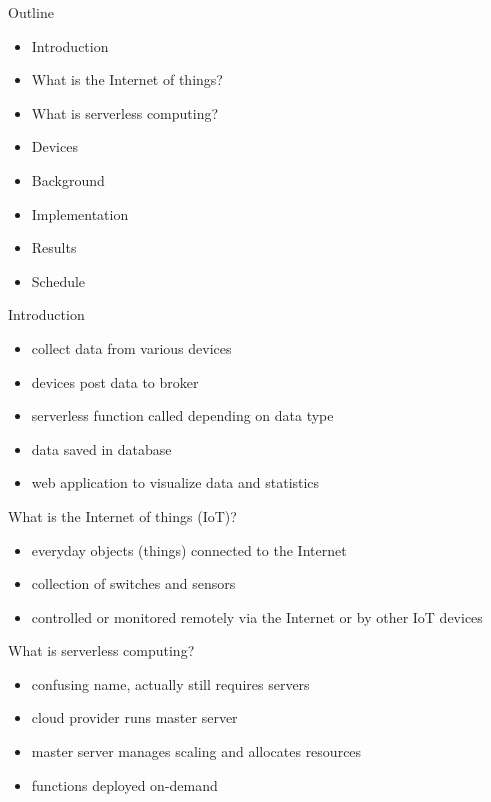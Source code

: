 \documentclass[aspectratio=1610]{beamer}
\begin{document}
  \maketitle

  \begin{frame}{Outline}
    \begin{itemize}
      \item Introduction
      \item What is the Internet of things?
      \item What is serverless computing?
      \item Devices
      \item Background
      \item Implementation
      \item Results
      \item Schedule
    \end{itemize}
  \end{frame}

  \begin{frame}{Introduction}
    \begin{itemize}
      \item collect data from various devices
      \item devices post data to broker
      \item serverless function called depending on data type
      \item data saved in database
      \item web application to visualize data and statistics
    \end{itemize}
  \end{frame}

  \begin{frame}{What is the Internet of things (IoT)?}
    \begin{itemize}
      \item everyday objects (things) connected to the Internet
      \item collection of switches and sensors
      \item controlled or monitored remotely via the Internet or by other IoT devices
    \end{itemize}
  \end{frame}

  \begin{frame}{What is serverless computing?}
    \begin{itemize}
      \item confusing name, actually still requires servers
      \item cloud provider runs master server
      \item master server manages scaling and allocates resources
      \item functions deployed on-demand
    \end{itemize}
  \end{frame}
\end{document}
